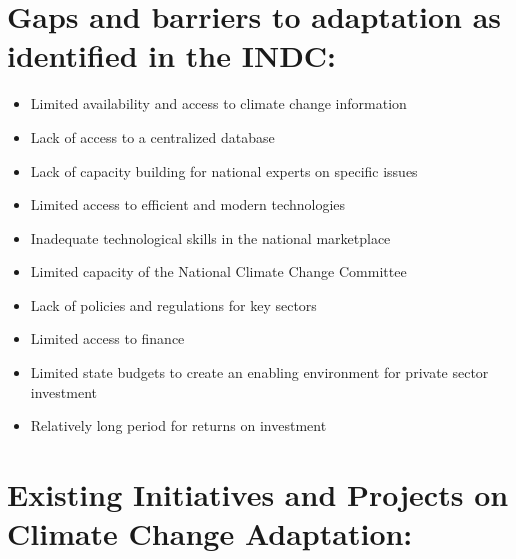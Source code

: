 \documentclass[
]{book}
\providecommand{\tightlist}{%
  \setlength{\itemsep}{0pt}\setlength{\parskip}{0pt}}
\begin{document}
\hypertarget{gaps-and-barriers-to-adaptation-as-identified-in-the-indc}{%
\section{Gaps and barriers to adaptation as identified in the INDC:}\label{gaps-and-barriers-to-adaptation-as-identified-in-the-indc}}

\begin{itemize}
\tightlist
\item
  Limited availability and access to climate change information\\
\item
  Lack of access to a centralized database
\item
  Lack of capacity building for national experts on specific issues
\item
  Limited access to efficient and modern technologies
\item
  Inadequate technological skills in the national marketplace
\item
  Limited capacity of the National Climate Change Committee
\item
  Lack of policies and regulations for key sectors
\item
  Limited access to finance
\item
  Limited state budgets to create an enabling environment for private sector investment
\item
  Relatively long period for returns on investment
\end{itemize}

\hypertarget{existing-initiatives-and-projects-on-climate-change-adaptation}{%
\section{Existing Initiatives and Projects on Climate Change Adaptation:}\label{existing-initiatives-and-projects-on-climate-change-adaptation}}

\providecommand{\docline}[3]{\noalign{\global\setlength{\arrayrulewidth}{#1}}\arrayrulecolor[HTML]{#2}\cline{#3}}

\setlength{\tabcolsep}{2pt}

\renewcommand*{\arraystretch}{1.5}
\end{document}
